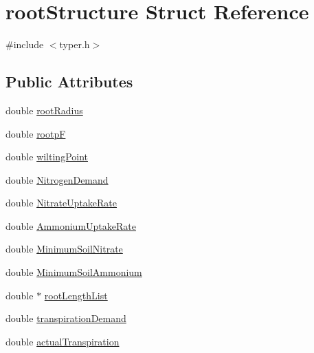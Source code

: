\hypertarget{structroot_structure}{
\section{rootStructure Struct Reference}
\label{structroot_structure}
}


{\ttfamily \#include $<$typer.h$>$}\subsection*{Public Attributes}
\begin{DoxyCompactItemize}
\item 
double \hyperlink{structroot_structure_ae822dd60a6dd1507a84c10ab228fe97e}{rootRadius}
\item 
double \hyperlink{structroot_structure_aeb9a13ce72bd039bc6821e4264b2da64}{rootpF}
\item 
double \hyperlink{structroot_structure_add1609bfc545cff300e81d8b707a0a4c}{wiltingPoint}
\item 
double \hyperlink{structroot_structure_ac0f131a12d7d312fb63c8f5731d2bedd}{NitrogenDemand}
\item 
double \hyperlink{structroot_structure_a6279d30c06e19a3e088f57fd6d793ed9}{NitrateUptakeRate}
\item 
double \hyperlink{structroot_structure_a5a6c705454eeafeb83624a2351b53cf1}{AmmoniumUptakeRate}
\item 
double \hyperlink{structroot_structure_a51bcb0f431a64a3b26d21a4e86a9d16e}{MinimumSoilNitrate}
\item 
double \hyperlink{structroot_structure_a80208bc0dea6228779648359e9bd1c01}{MinimumSoilAmmonium}
\item 
double $\ast$ \hyperlink{structroot_structure_a20025f911a33441a80de37712a1a659c}{rootLengthList}
\item 
double \hyperlink{structroot_structure_a9a245fabd4034d40698a238e789c3c7d}{transpirationDemand}
\item 
double \hyperlink{structroot_structure_ac5932526da0cac056674b385da3b52a1}{actualTranspiration}
\end{DoxyCompactItemize}


